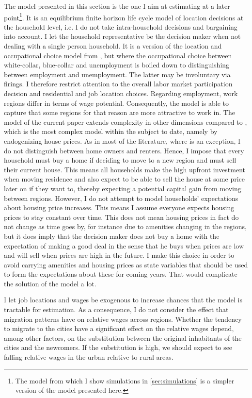 The model presented in this section is the one I aim at estimating at a later point\footnote{The model from which I show simulations in \autoref{sec:simulations} is a simpler version of the model presented here.}. It is an equilibrium finite horizon life cycle model of location decisions at the household level, i.e. I do not take intra-household decisions and bargaining into account. I let the household representative be the decision maker when not dealing with a single person household. It is a version of the location and occupational choice model from \citet{Buchinsky2014}, but where the occupational choice between white-collar, blue-collar and unemployment is boiled down to distinguishing between employment and unemployment. The latter may be involuntary via firings. I therefore restrict attention to the overall labor market participation decision and residential and job location choices. Regarding employment, work regions differ in terms of wage potential. Consequently, the model is able to capture that some regions for that reason are more attractive to work in. The model of the current paper extends complexity in other dimensions compared to \citet{Buchinsky2014}, which is the most complex model within the subject to date, namely by endogenizing house prices. As in most of the literature, where \citet{Oswald2015} is an exception, I do not distinguish between home owners and renters. Hence, I impose that every household must buy a home if deciding to move to a new region and must sell their current house. This means all households make the high upfront investment when moving residence and also expect to be able to sell the house at some price later on if they want to, thereby expecting a potential capital gain from moving between regions. However, I do not attempt to model households' expectations about housing price increases. This means I assume everyone expects housing prices to stay constant over time. This does not mean housing prices in fact do not change as time goes by, for instance due to amenities changing in the regions, but it does imply that the decision maker does not buy a home with the expectation of making a good deal in the sense that he buys when prices are low and will sell when prices are high in the future. I make this choice in order to avoid carrying amenities and housing prices as state variables that should be used to form the expectations about these for coming years. That would complicate the solution of the model a lot. 

I let job locations and wages be exogenous to increase chances that the model is tractable for estimation. As a consequence, I do not consider the effect that migration patterns have on relative wages across regions. Whether the tendency to migrate to the cities have a significant effect on the relative wages depend, among other factors, on the substitution between the original inhabitants of the cities and the newcomers. If the substitution is high, we should expect to see falling relative wages in the urban relative to rural areas. 

